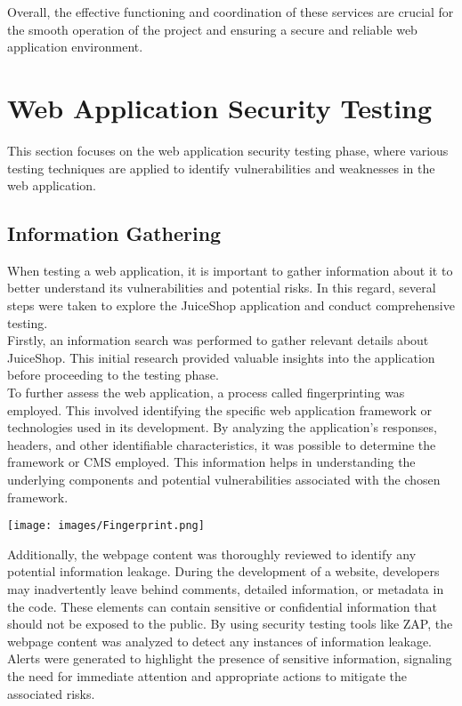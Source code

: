 \documentclass[12pt]{article}
\begin{document}
Overall, the effective functioning and coordination of these services are crucial for the smooth operation of the project and ensuring a secure and reliable web application environment.


\section{Web Application Security Testing}

This section focuses on the web application security testing phase, where various testing techniques are applied to identify vulnerabilities and weaknesses in the web application.

\subsection{Information Gathering}
When testing a web application, it is important to gather information about it to better understand its vulnerabilities and potential risks. In this regard, several steps were taken to explore the JuiceShop application and conduct comprehensive testing.\\

Firstly, an information search was performed to gather relevant details about JuiceShop. This initial research provided valuable insights into the application before proceeding to the testing phase.\\

To further assess the web application, a process called fingerprinting was employed. This involved identifying the specific web application framework or technologies used in its development. By analyzing the application's responses, headers, and other identifiable characteristics, it was possible to determine the framework or CMS employed. This information helps in understanding the underlying components and potential vulnerabilities associated with the chosen framework.\\


\begin{center}
    \texttt{[image: images/Fingerprint.png]}
\end{center}


Additionally, the webpage content was thoroughly reviewed to identify any potential information leakage. During the development of a website, developers may inadvertently leave behind comments, detailed information, or metadata in the code. These elements can contain sensitive or confidential information that should not be exposed to the public. By using security testing tools like ZAP, the webpage content was analyzed to detect any instances of information leakage. Alerts were generated to highlight the presence of sensitive information, signaling the need for immediate attention and appropriate actions to mitigate the associated risks.\\
\end{document}
